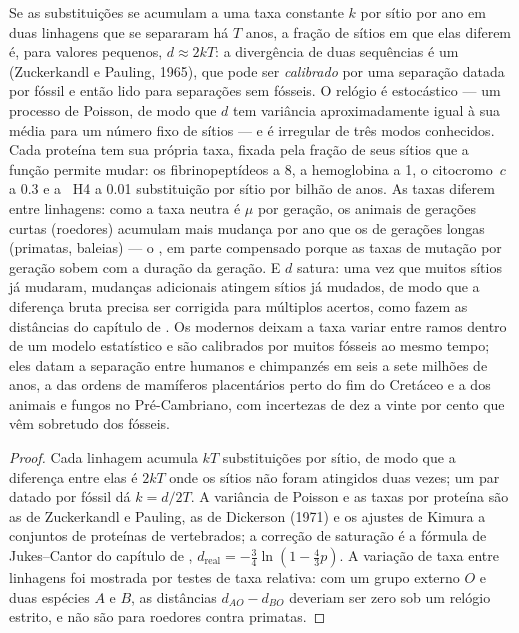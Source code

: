 \begin{proposition}\label{prop:b3:molecular-evolution:clock}
Se as substituições se acumulam a uma taxa constante $k$ por sítio por
ano em duas linhagens que se separaram há $T$ anos, a fração de sítios em
que elas diferem é, para valores pequenos, $d \approx 2kT$: a divergência
de duas sequências é um \emph{} (Zuckerkandl e Pauling,
1965), que pode ser \emph{calibrado} por uma separação datada por fóssil
e então lido para separações sem fósseis. O relógio é estocástico --- um
processo de Poisson, de modo que $d$ tem variância aproximadamente igual à
sua média para um número fixo de sítios --- e é irregular de três modos
conhecidos. Cada proteína tem sua própria taxa, fixada pela fração de
seus sítios que a função permite mudar: os fibrinopeptídeos a \num{8}, a
hemoglobina a \num{1}, o citocromo~$c$ a \num{0.3} e a ~H4 a
\num{0.01} substituição por sítio por bilhão de anos. As taxas diferem
entre linhagens: como a taxa neutra é $\mu$ por geração, os animais de
gerações curtas (roedores) acumulam mais mudança por ano que os de
gerações longas (primatas, baleias) --- o \emph{}, em parte compensado porque as taxas de mutação por geração
sobem com a duração da geração. E $d$ satura: uma vez que muitos sítios
já mudaram, mudanças adicionais atingem sítios já mudados, de modo que a
diferença bruta precisa ser corrigida para múltiplos acertos, como fazem
as distâncias do capítulo de . Os \emph{}
modernos deixam a taxa variar entre ramos dentro de um modelo estatístico
e são calibrados por muitos fósseis ao mesmo tempo; eles datam a
separação entre humanos e chimpanzés em seis a sete milhões de anos, a
das ordens de mamíferos placentários perto do fim do Cretáceo e a dos
animais e fungos no Pré-Cambriano, com incertezas de dez a vinte por
cento que vêm sobretudo dos fósseis.
\end{proposition}
\begin{proof}
Cada linhagem acumula $kT$ substituições por sítio, de modo que a
diferença entre elas é $2kT$ onde os sítios não foram atingidos duas
vezes; um par datado por fóssil dá $k = d/2T$. A variância de Poisson e
as taxas por proteína são as de Zuckerkandl e Pauling, as de Dickerson
(1971) e os ajustes de Kimura a conjuntos de proteínas de vertebrados; a
correção de saturação é a fórmula de Jukes--Cantor do capítulo de
, $d_{\text{real}} =
-\tfrac{3}{4}\ln(1 - \tfrac{4}{3}p)$. A
variação de taxa entre linhagens foi mostrada por testes de taxa
relativa: com um grupo externo $O$ e duas espécies $A$ e $B$, as
distâncias $d_{AO} - d_{BO}$ deveriam ser zero sob um relógio estrito, e
não são para roedores contra primatas.
\end{proof}

